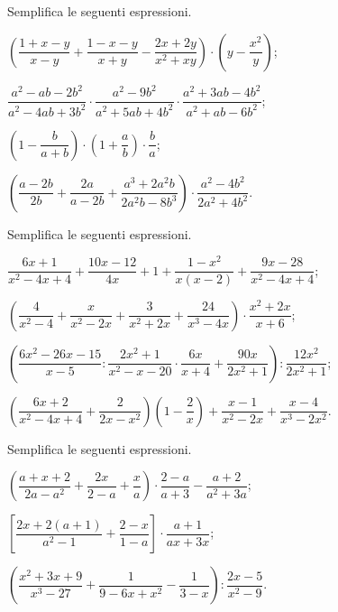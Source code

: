 \begin{esercizio}[\Ast]
\label{ese:14.53}
Semplifica le seguenti espressioni.
\begin{enumeratea}
 \item $\left(\dfrac{1+x-y}{x-y}+\dfrac{1-x-y}{x+y}-\dfrac{2x+2y}{x^{2}+xy}\right)\cdot \left(y-\dfrac{x^{2}}{y}\right)$;
 \item $\dfrac{a^{2}-ab-2b^{2}}{a^{2}-4ab+3b^{2}}\cdot\dfrac{a^{2}-9b^{2}}{a^{2}+5ab+4b^{2}}\cdot\dfrac{a^{2}+3ab-4b^{2}}{a^{2}+ab-6b^{2}}$;
 \item $\left(1-\dfrac{b}{a+b}\right)\cdot\left(1+\dfrac{a}{b}\right)\cdot \dfrac{b}{a}$;
 \item $\left(\dfrac{a-2b}{2b}+\dfrac{2a}{a-2b}+\dfrac{a^{3}+2a^{2}b}{2a^{2}b-8b^{3}}\right)\cdot\dfrac{a^{2}-4b^{2}}{2a^{2}+4b^{2}}$.
\end{enumeratea}
\end{esercizio}

\begin{esercizio}[\Ast]
\label{ese:14.54}
Semplifica le seguenti espressioni.
\begin{enumeratea}
 \item $\dfrac{6x+1}{x^{2}-4x+4}+\dfrac{10x-12}{4x}+1+\dfrac{1-x^{2}}{x(x-2)}+\dfrac{9x-28}{x^{2}-4x+4}$;
 \item $\left(\dfrac{4}{x^{2}-4}+\dfrac{x}{x^{2}-2x}+\dfrac{3}{x^{2}+2x}+\dfrac{24}{x^{3}-4x}\right)\cdot {\dfrac{x^{2}+2x}{x+6}}$;
 \item $\left(\dfrac{6x^{2}-26x-15}{x-5}:\dfrac{2x^{2}+1}{x^{2}-x-20}\cdot {\dfrac{6x}{x+4}+\dfrac{90x}{2x^{2}+1}}\right):\dfrac{12x^{2}}{2x^{2}+1}$;
 \item $\left(\dfrac{6x+2}{x^{2}-4x+4}+\dfrac{2}{2x-x^{2}}\right)\left(1-\dfrac{2}{x}\right)+\dfrac{x-1}{x^{2}-2x}+\dfrac{x-4}{x^{3}-2x^{2}}$.
\end{enumeratea}
\end{esercizio}

\begin{esercizio}[\Ast]
\label{ese:14.55}
Semplifica le seguenti espressioni.
\begin{enumeratea}
 \item $\left(\dfrac{a+x+2}{2a-a^{2}}+\dfrac{2x}{2-a}+\dfrac{x}{a}\right)\cdot {\dfrac{2-a}{a+3}}-\dfrac{a+2}{a^{2}+3a}$;
 \item $\left[\dfrac{2x+2(a+1)}{a^{2}-1}+\dfrac{2-x}{1-a}\right]\cdot {\dfrac{a+1}{ax+3x}}$;
 \item $\left(\dfrac{x^{2}+3x+9}{x^{3}-27}+\dfrac{1}{9-6x+x^{2}}-\dfrac{1}{3-x}\right):\dfrac{2x-5}{x^{2}-9}$.
\end{enumeratea}
\end{esercizio}

